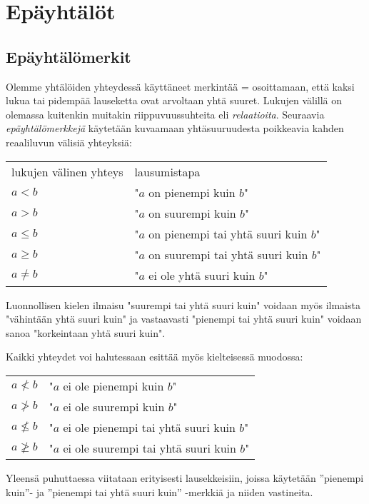 \chapter{Epäyhtälöt}

\section{Epäyhtälömerkit}

Olemme yhtälöiden yhteydessä käyttäneet merkintää = osoittamaan, että kaksi lukua tai pidempää lauseketta ovat arvoltaan yhtä suuret. Lukujen välillä on olemassa kuitenkin muitakin riippuvuussuhteita eli \emph{relaatioita}. Seuraavia \emph{epäyhtälömerkkejä} käytetään kuvaamaan yhtäsuuruudesta poikkeavia kahden reaaliluvun välisiä yhteyksiä:

\begin{tabular}{ll}
lukujen välinen yhteys & lausumistapa \\
$a<b$ &  "$a$ on pienempi kuin $b$"\\
$a>b$ & "$a$ on suurempi kuin $b$"\\
$a \leq b$ & "$a$ on pienempi tai yhtä suuri kuin $b$" \\
$a \geq b$ & "$a$ on suurempi tai yhtä suuri kuin $b$" \\
$a\neq b$ & "$a$ ei ole yhtä suuri kuin $b$" \\
\end{tabular}

Luonnollisen kielen ilmaisu "suurempi tai yhtä suuri kuin" voidaan myös ilmaista
"vähintään yhtä suuri kuin" ja vastaavasti "pienempi tai yhtä suuri kuin"
voidaan sanoa "korkeintaan yhtä suuri kuin".

Kaikki yhteydet voi halutessaan esittää myös kielteisessä muodossa:

\begin{tabular}{ll}
$a \nless b$ &  "$a$ ei ole pienempi kuin $b$"\\
$a \ngtr b$ & "$a$ ei ole suurempi kuin $b$"\\
$a \nleq b$ & "$a$ ei ole pienempi tai yhtä suuri kuin $b$" \\
$a \ngeq b$ & "$a$ ei ole suurempi tai yhtä suuri kuin $b$" \\
\end{tabular}

Yleensä  puhuttaessa viitataan erityisesti lausekkeisiin, joissa käytetään ''pienempi kuin''- ja ''pienempi tai yhtä suuri kuin'' -merkkiä ja niiden vastineita.

